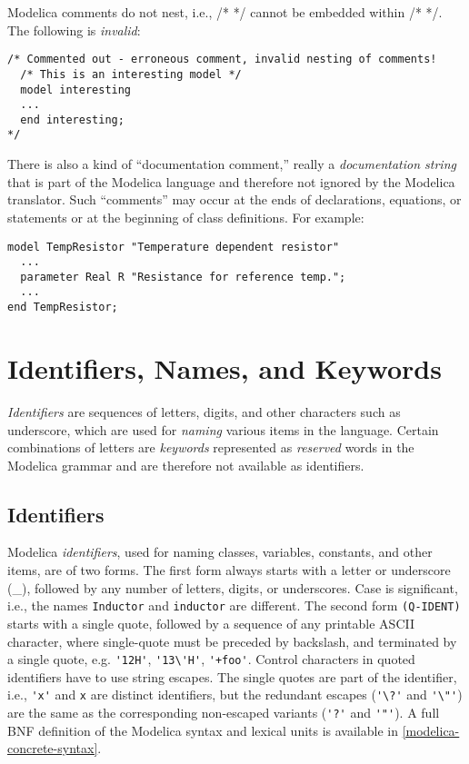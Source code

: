 Modelica comments do not nest, i.e., /* */ cannot be embedded within /*
*/. The following is \emph{invalid}:
\begin{lstlisting}[language=modelica]
/* Commented out - erroneous comment, invalid nesting of comments!
  /* This is an interesting model */
  model interesting
  ...
  end interesting;
*/
\end{lstlisting}

There is also a kind of ``documentation comment,'' really a
\emph{documentation string} that is part of the Modelica language and
therefore not ignored by the Modelica translator. Such ``comments'' may
occur at the ends of declarations, equations, or statements or at the
beginning of class definitions. For example:

\begin{lstlisting}[language=modelica]
model TempResistor "Temperature dependent resistor"
  ...
  parameter Real R "Resistance for reference temp.";
  ...
end TempResistor;
\end{lstlisting}

\section{Identifiers, Names, and Keywords}

\emph{Identifiers} are sequences of letters, digits, and other
characters such as underscore, which are used for \emph{naming} various
items in the language. Certain combinations of letters are
\emph{keywords} represented as \emph{reserved} words in the Modelica
grammar and are therefore not available as identifiers.

\subsection{Identifiers}

Modelica \emph{identifiers}, used for naming classes, variables,
constants, and other items, are of two forms. The first form always
starts with a letter or underscore (\_), followed by any number of
letters, digits, or underscores. Case is significant, i.e., the names
\lstinline[basicstyle=\ttfamily]!Inductor! and \lstinline[basicstyle=\ttfamily]!inductor! are different. The second form \lstinline[basicstyle=\ttfamily]!(Q-IDENT)! starts
with a single quote, followed by a sequence of any printable ASCII
character, where single-quote must be preceded by backslash, and
terminated by a single quote, e.g. \lstinline[basicstyle=\ttfamily]!'12H'!, \lstinline[basicstyle=\ttfamily]!'13\'H'!,
\lstinline[basicstyle=\ttfamily]!'+foo'!. Control characters in quoted identifiers have to use string
escapes. 
The single quotes are part of the identifier, i.e., \lstinline[basicstyle=\ttfamily]!'x'! and \lstinline[basicstyle=\ttfamily]!x! 
are distinct identifiers, but the redundant escapes (\lstinline[basicstyle=\ttfamily]!'\?'! and \lstinline[basicstyle=\ttfamily]!'\"'!) are the same as the corresponding non-escaped
variants (\lstinline[basicstyle=\ttfamily]!'?'! and \lstinline[basicstyle=\ttfamily]!'"'!). A full BNF definition of the Modelica syntax and
lexical units is available in \autoref{modelica-concrete-syntax}.

